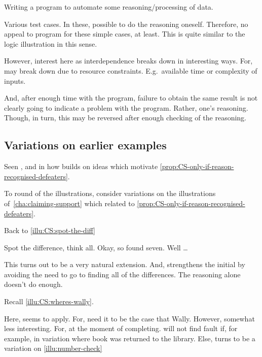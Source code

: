 \begin{note}[Programming]
  \begin{illustration}
    \label{illu:programming}
    Writing a program to automate some reasoning/processing of data.
  \end{illustration}
  Various test cases.
  In these, possible to do the reasoning oneself.
  Therefore, no appeal to program for these simple cases, at least.
  This is quite similar to the logic illustration in this sense.

  However, interest here as interdependence breaks down in interesting ways.
  For, may break down due to resource constraints.
  E.g.\ available time or complexity of inputs.

  And, after enough time with the program, failure to obtain the same result is not clearly going to indicate a problem with the program.
  Rather, one's reasoning.
  Though, in turn, this may be reversed after enough checking of the reasoning.
\end{note}

\subsection{Variations on earlier examples}

\begin{note}
  Seen \nI{}, and in how builds on ideas which motivate \autoref{prop:CS-only-if-reason-recognised-defeaters}.

  To round of the illustrations, consider variations on the illustrations of~\autoref{cha:claiming-support} which related to \autoref{prop:CS-only-if-reason-recognised-defeaters}.
\end{note}

\begin{note}
  Back to \autoref{illu:CS:spot-the-diff}

  Spot the difference, think all.
  Okay, so found seven.
  Well \dots

  This turns out to be a very natural extension.
  And, strengthens the initial by avoiding the need to go to finding all of the differences.
  The reasoning alone doesn't do enough.
\end{note}

\begin{note}[Wally]
  Recall \autoref{illu:CS:wheres-wally}.

  Here, seems to apply.
  For, need it to be the case that Wally.
  However, somewhat less interesting.
  For, at the moment of completing.
  \nI{} will not find fault if, for example, in variation where book was returned to the library.
  Else, turns to be a variation on \autoref{illu:number-check}
\end{note}

